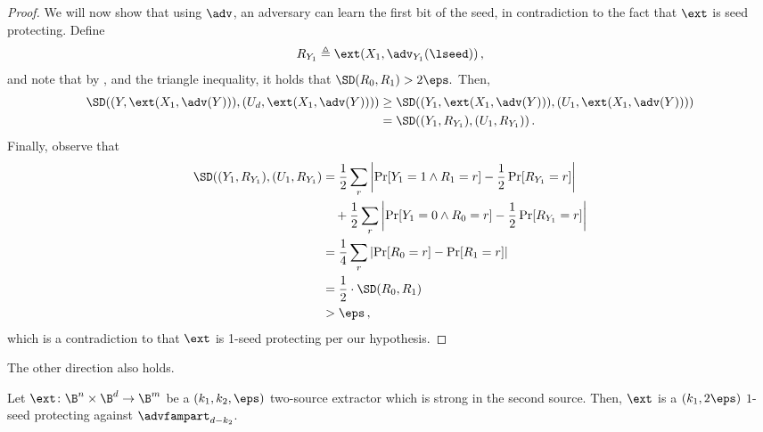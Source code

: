 \documentclass{toc}
\begin{document}
\begin{proof}
We will now show that using $\adv$, an adversary can learn the first bit of the seed, in contradiction to the fact that $\ext$ is seed protecting.
Define \[R_{Y_1} \triangleq \ext(X_1,\adv_{Y_1}(\lseed))\,,\] and note that by ,  and the triangle inequality, it holds that 
$\SD(R_0,R_1) > 2\eps.$
Then,
\begin{align*}
\SD(( Y,\ext(X_1,\adv(Y))), (U_d,\ext(X_1,\adv(Y)))) &\geq
\SD(( Y_1,\ext(X_1,\adv(Y))), (U_1, \ext(X_1,\adv(Y)))) \\ 
&=\SD(( Y_1, R_{Y_1}), (U_1,R_{Y_1}))\,.
\end{align*}
%
%
%
Finally, observe that 
\begin{align*}
\SD(( Y_1, R_{Y_1}), (U_1,R_{Y_1}) &= \frac{1}{2}\sum_{r}\left| \Pr[Y_1 = 1 \wedge R_{1} = r] - \frac{1}{2}\Pr[R_{Y_1}=r] \right| \\
&~~~+ \frac{1}{2}\sum_{r}\left| \Pr[Y_1 = 0 \wedge R_{0} = r] - \frac{1}{2}\Pr[R_{Y_1}=r] \right| \\ 
&= \frac{1}{4}\sum_{r}\left| \Pr[R_0 = r] - \Pr[R_1=r] \right| \\ &= \frac{1}{2} \cdot \SD(R_0,R_1) \\ &> \eps\,,
\end{align*}
which is a contradiction to that $\ext$ is 1-seed protecting per our hypothesis.%



\end{proof}

The other direction also holds.

\begin{lemma}\label{lem:two-source}
Let $\ext \colon \B^n \times \B^d \rightarrow \B^m$ be a 
$(k_1,k_2,\eps)$ two-source extractor which is strong in the second source. Then, $\ext$ is a $(k_1,2\eps)$
$1$-seed protecting against $\advfampart_{d-k_2}$.
\end{lemma}
\end{document}
